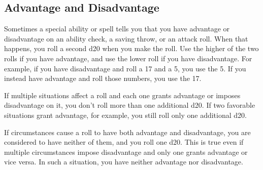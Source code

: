 \subsection{Advantage and Disadvantage}
Sometimes a special ability or spell tells you that you have advantage or disadvantage on an ability check, a saving throw, or an attack roll. When that happens, you roll a second d20 when you make the roll. Use the higher of the two rolls if you have advantage, and use the lower roll if you have disadvantage. For example, if you have disadvantage and roll a 17 and a 5, you use the 5. If you instead have advantage and roll those numbers, you use the 17.

If multiple situations affect a roll and each one grants advantage or imposes disadvantage on it, you don't roll more than one additional d20. If two favorable situations grant advantage, for example, you still roll only one additional d20.

If circumstances cause a roll to have both advantage and disadvantage, you are considered to have neither of them, and you roll one d20. This is true even if multiple circumstances impose disadvantage and only one grants advantage or vice versa. In such a situation, you have neither advantage nor disadvantage.